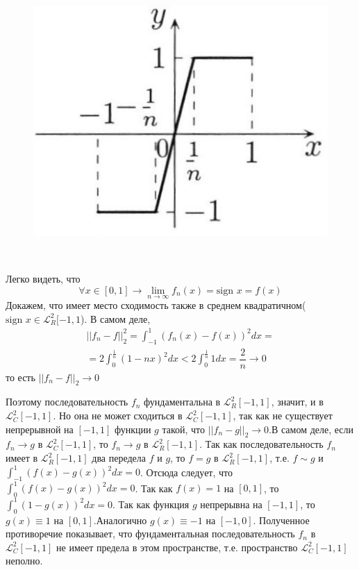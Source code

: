\begin{greyProof}
\begin{minipage}{0.4\linewidth}
	\begin{figure}[H]
		\centering
		\includegraphics[width=\linewidth]{pic1.png}
	\end{figure}
\end{minipage}
~
\begin{minipage}{0.6\linewidth}
Легко видеть, что
\[
	\forall x \in [0,1] \rightarrow \lim\limits_{n \rightarrow \infty} f_n(x) = \text{sign }x = f(x)  
\]
Докажем, что имеет место сходимость также в среднем квадратичном($ \text{sign }x \in \mathcal{L}_R^2[-1,1 $). В самом деле,
\begin{multline*}
	||f_n - f||_2^2 = \int_{-1}^1 (f_n(x) - f(x))^2dx =\\= 2\int_{0}^{\frac{1}{n}}(1-nx)^2dx < 2\int_{0}^{\frac{1}{n}}1dx = \dfrac{2}{n} \rightarrow 0
\end{multline*}
то есть $ ||f_n-f||_2 \rightarrow0 $
\end{minipage}
\end{greyProof}
\begin{greyEmpty}
Поэтому последовательность $ f_n $ фундаментальна в $ \mathcal{L}_R^2[-1,1] $, значит, и в $ \mathcal{L}_C^2[-1,1] $. Но она не может сходиться в $ \mathcal{L}_C^2[-1,1] $, так как не существует непрерывной на $ [-1,1] $ функции $ g $ такой, что $ ||f_n-g||_2 \rightarrow 0 $.В самом деле, если $ f_n \rightarrow g $ в $ \mathcal{L}_C^2[-1,1] $, то $ f_n \rightarrow g $ в $ \mathcal{L}_R^2[-1,1]$. Так как последовательность $ f_n $ имеет в $ \mathcal{L}_R^2[-1,1] $ два передела $ f $ и $ g $, то $ f =g $ в $ \mathcal{L}_R^2[-1,1] $, т.е. $ f\sim g $ и $ \int_{-1}^1 (f(x) - g(x))^2 dx = 0 $. Отсюда следует, что $ \int_{0}^1 (f(x)-g(x))^2dx = 0 $. Так как $ f(x) = 1 $ на $ [0,1] $, то $ \int_{0}^1(1-g(x))^2dx = 0 $. Так как функция $ g $ непрерывна на $ [-1,1] $, то $ g(x) \equiv 1 $ на $ [0,1] $.Аналогично $ g(x) \equiv -1 $ на $ [-1,0] $. Полученное противоречие показывает, что фундаментальная последовательность $ f_n $ в $ \mathcal{L}_C^2[-1,1] $ не имеет предела в этом пространстве, т.е. пространство $ \mathcal{L}_C^2[-1,1] $ неполно.
\end{greyEmpty}